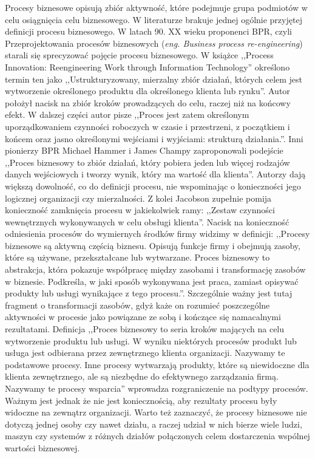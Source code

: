 Procesy biznesowe opisują zbiór aktywność, które podejmuje grupa podmiotów w celu osiągnięcia celu biznesowego. W literaturze brakuje jednej ogólnie przyjętej definicji procesu biznesowego. W latach 90. XX wieku proponenci BPR, czyli Przeprojektowania procesów biznesowych (\textit{eng. Business process re-engineering}) starali się sprecyzować pojęcie procesu biznesowego. W książce ,,Process Innovation: Reengineering Work through Information Technology''\cite{davenport1993process} określono termin ten jako ,,Ustrukturyzowany, mierzalny zbiór działań, których celem jest wytworzenie określonego produktu dla określonego klienta lub rynku''. Autor położył nacisk na zbiór kroków prowadzących do celu, raczej niż na końcowy efekt. W dalszej części autor pisze ,,Proces jest zatem określonym uporządkowaniem czynności roboczych w czasie i przestrzeni, z początkiem i końcem oraz jasno określonymi wejściami i wyjściami: strukturą działania.''. Inni pionierzy BPR Michael Hammer i James Champy zaproponowali  podejście ,,Proces biznesowy to zbiór działań, który pobiera jeden lub więcej rodzajów danych wejściowych i tworzy wynik, który ma wartość dla klienta''\cite{HAMMER199390}. Autorzy dają większą dowolność, co do definicji procesu, nie wspominając o konieczności jego logicznej organizacji czy mierzalności. Z kolei Jacobson zupełnie pomija konieczność zamknięcia procesu w jakiekolwiek ramy: ,,Zestaw czynności wewnętrznych wykonywanych w celu obsługi klienta''\cite{JacobsonObjectAdvantage}. Nacisk na konieczność odniesienia procesów do wymiernych środków firmy widzimy w definicji: ,,Procesy biznesowe są aktywną częścią biznesu. Opisują funkcje firmy i obejmują zasoby, które są używane, przekształcane lub wytwarzane. Proces biznesowy to abstrakcja, która pokazuje współpracę między zasobami i transformację zasobów w biznesie. Podkreśla, w jaki sposób wykonywana jest praca, zamiast opisywać produkty lub usługi wynikające z tego procesu.''\cite{Eriksson2000BusinessMW}. Szczególnie ważny jest tutaj fragment o transformacji zasobów, gdyż każe on rozumieć poszczególne aktywności w procesie jako powiązane ze sobą i kończące się namacalnymi rezultatami. Definicja ,,Proces biznesowy to seria kroków mających na celu wytworzenie produktu lub usługi. W wyniku niektórych procesów produkt lub usługa jest odbierana przez zewnętrznego klienta organizacji. Nazywamy te podstawowe procesy. Inne procesy wytwarzają produkty, które są niewidoczne dla klienta zewnętrznego, ale są niezbędne do efektywnego zarządzania firmą. Nazywamy te procesy wsparcia''\cite{rummler_brache_1995} wprowadza rozgraniczenie na podtypy procesów. Ważnym jest jednak że nie jest koniecznością, aby rezultaty procesu były widoczne na zewnątrz organizacji. Warto też zaznaczyć, że procesy biznesowe nie dotyczą jednej osoby czy nawet działu, a raczej udział w nich bierze wiele ludzi, maszyn czy systemów z różnych działów połączonych celem dostarczenia wspólnej wartości biznesowej.

